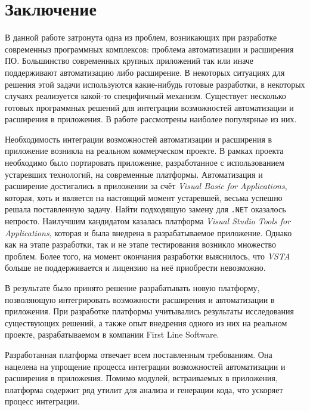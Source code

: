 \setcounter{secnumdepth}{0}
\section{Заключение}
\setcounter{secnumdepth}{2}

В данной работе затронута одна из проблем, возникающих при разработке современныз программных комплексов: проблема автоматизации и расширения ПО. Большинство современных крупных приложений так или иначе поддерживают автоматизацию либо расширение. В некоторых ситуациях для решения этой задачи используются какие-нибудь готовые разработки, в некоторых случаях реализуется какой-то специфичный механизм. Существует несколько готовых программных решений для интеграции возможностей автоматизации и расширения в приложения. В работе рассмотрены наиболее популярные из них. 

Необходимость интеграции возможностей автоматизации и расширения в приложение возникла на реальном коммерческом проекте. В рамках проекта необходимо было портировать приложение, разработанное с использованием устаревших технологий, на современные платформы. Автоматизация и расширение достигались в приложении за счёт {\it Visual Basic for Applications}, которая, хоть и является на настоящий момент устаревшей, весьма успешно решала поставленную задачу. Найти подходящую замену для {\tt .NET} оказалось непросто. Наилучшим кандидатом казалась платформа {\it Visual Studio Tools for Applications}, которая и была внедрена в разрабатываемое приложение. Однако как на этапе разработки, так и не этапе тестирования возникло множество проблем. Более того, на момент окончания разработки выяснилось, что {\it VSTA} больше не поддерживается и лицензию на неё приобрести невозможно.

В результате было принято решение разрабатывать новую платформу, позволяющую интегрировать возможности расширения и автоматизации в приложения. При разработке платформы учитывались результаты исследования существующих решений, а также опыт внедрения одного из них на реальном проекте, разрабатываемом в компании First Line Software.

Разработанная платформа отвечает всем поставленным требованиям. Она нацелена на упрощение процесса интеграции возможностей автоматизации и расширения в приложения. Помимо модулей, встраиваемых в приложения, платформа содержит ряд утилит для анализа и генерации кода, что ускоряет процесс интеграции.

\pagebreak
